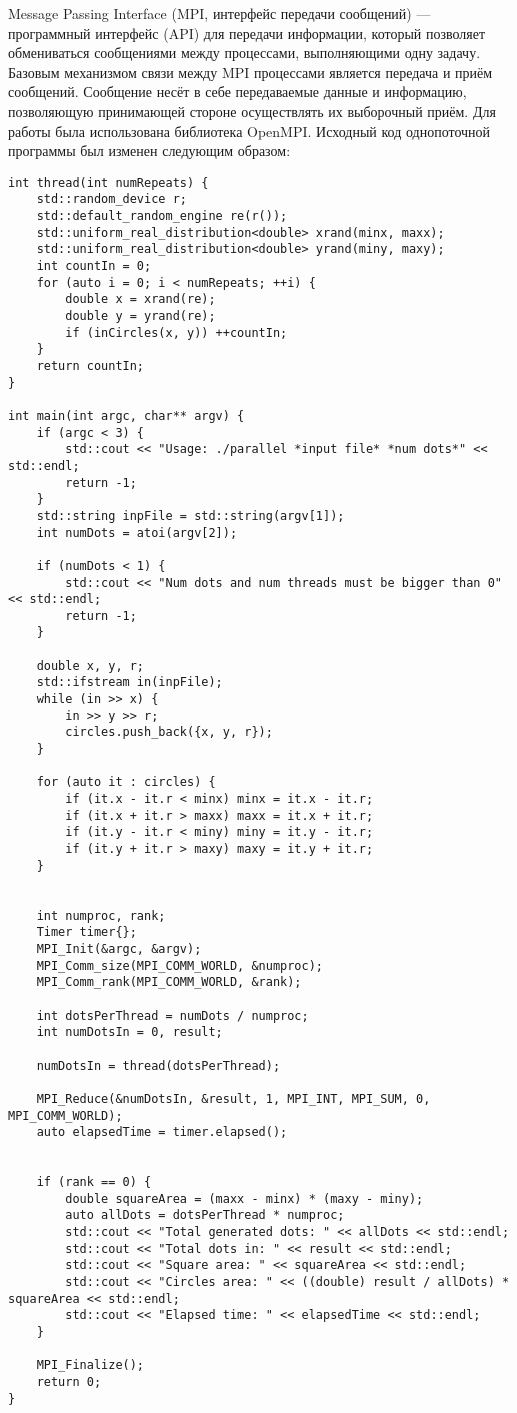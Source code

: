 Message Passing Interface (MPI, интерфейс передачи сообщений) --- программный интерфейс (API) для передачи информации, который позволяет обмениваться сообщениями между процессами, выполняющими одну задачу. Базовым механизмом связи между MPI процессами является передача и приём сообщений. Сообщение несёт в себе передаваемые данные и информацию, позволяющую принимающей стороне осуществлять их выборочный приём. Для работы была использована библиотека OpenMPI. Исходный код однопоточной программы был изменен следующим образом:
\begin{lstlisting}[caption={Многопоточность на Pthreads}, label={lst:pthreads}, style=crs_cpp]
int thread(int numRepeats) {
    std::random_device r;
    std::default_random_engine re(r());
    std::uniform_real_distribution<double> xrand(minx, maxx);
    std::uniform_real_distribution<double> yrand(miny, maxy);
    int countIn = 0;
    for (auto i = 0; i < numRepeats; ++i) {
        double x = xrand(re);
        double y = yrand(re);
        if (inCircles(x, y)) ++countIn;
    }
    return countIn;
}

int main(int argc, char** argv) {
    if (argc < 3) {
        std::cout << "Usage: ./parallel *input file* *num dots*" << std::endl;
        return -1;
    }
    std::string inpFile = std::string(argv[1]);
    int numDots = atoi(argv[2]);

    if (numDots < 1) {
        std::cout << "Num dots and num threads must be bigger than 0" << std::endl;
        return -1;
    }

    double x, y, r;
    std::ifstream in(inpFile);
    while (in >> x) {
        in >> y >> r;
        circles.push_back({x, y, r});
    }

    for (auto it : circles) {
        if (it.x - it.r < minx) minx = it.x - it.r;
        if (it.x + it.r > maxx) maxx = it.x + it.r;
        if (it.y - it.r < miny) miny = it.y - it.r;
        if (it.y + it.r > maxy) maxy = it.y + it.r;
    }


    int numproc, rank;
    Timer timer{};
    MPI_Init(&argc, &argv);
    MPI_Comm_size(MPI_COMM_WORLD, &numproc);
    MPI_Comm_rank(MPI_COMM_WORLD, &rank);

    int dotsPerThread = numDots / numproc;
    int numDotsIn = 0, result;

    numDotsIn = thread(dotsPerThread);

    MPI_Reduce(&numDotsIn, &result, 1, MPI_INT, MPI_SUM, 0, MPI_COMM_WORLD);
    auto elapsedTime = timer.elapsed();


    if (rank == 0) {
        double squareArea = (maxx - minx) * (maxy - miny);
        auto allDots = dotsPerThread * numproc;
        std::cout << "Total generated dots: " << allDots << std::endl;
        std::cout << "Total dots in: " << result << std::endl;
        std::cout << "Square area: " << squareArea << std::endl;
        std::cout << "Circles area: " << ((double) result / allDots) * squareArea << std::endl;
        std::cout << "Elapsed time: " << elapsedTime << std::endl;
    }

    MPI_Finalize();
    return 0;
}
\end{lstlisting}

